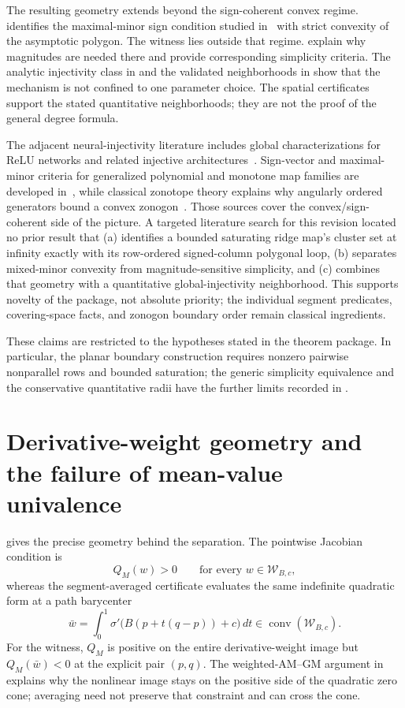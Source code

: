 \documentclass[11pt,twoside,leqno]{article}
\theoremstyle{plain}
\theoremstyle{definition}
\theoremstyle{remark}
\newcommand{\Wder}{\mathcal{W}_{B,c}}
\begin{document}
The resulting geometry extends beyond the sign-coherent convex regime.  identifies the maximal-minor sign condition studied in~\cite{mhr,fmr} with strict convexity of the asymptotic polygon. The witness lies outside that regime.  explain why magnitudes are needed there and provide corresponding simplicity criteria. The analytic injectivity class in  and the validated neighborhoods in  show that the mechanism is not confined to one parameter choice. The spatial certificates support the stated quantitative neighborhoods; they are not the proof of the general degree formula.

The adjacent neural-injectivity literature includes global characterizations for ReLU networks and related injective architectures~\cite{puthawala}.  Sign-vector and maximal-minor criteria for generalized polynomial and monotone map families are developed in~\cite{muller-sign,mhr,fmr}, while classical zonotope theory explains why angularly ordered generators bound a convex zonogon~\cite{ziegler}. Those sources cover the convex/sign-coherent side of the picture.  A targeted literature search for this revision located no prior result that (a) identifies a bounded saturating ridge map's cluster set at infinity exactly with its row-ordered signed-column polygonal loop, (b) separates mixed-minor convexity from magnitude-sensitive simplicity, and (c) combines that geometry with a quantitative global-injectivity neighborhood.  This supports novelty of the package, not absolute priority; the individual segment predicates, covering-space facts, and zonogon boundary order remain classical ingredients.

These claims are restricted to the hypotheses stated in the theorem package. In particular, the planar boundary construction requires nonzero pairwise nonparallel rows and bounded saturation; the generic simplicity equivalence and the conservative quantitative radii have the further limits recorded in .

\section{Derivative-weight geometry and the failure of mean-value univalence}\label{sec:reconcile}

 gives the precise geometry behind the separation. The pointwise Jacobian condition is
\[
 Q_M(w)>0\qquad\text{for every }w\in\Wder,
\]
whereas the segment-averaged certificate evaluates the same indefinite quadratic form at a path barycenter
\[
 \bar w=\int_0^1\sigma'\bigl(B(p+t(q-p))+c\bigr)\,dt
 \in\operatorname{conv}(\Wder).
\]
For the witness, $Q_M$ is positive on the entire derivative-weight image but $Q_M(\bar w)<0$ at the explicit pair $(p,q)$.  The weighted-AM--GM argument in  explains why the nonlinear image stays on the positive side of the quadratic zero cone; averaging need not preserve that constraint and can cross the cone.
\end{document}
